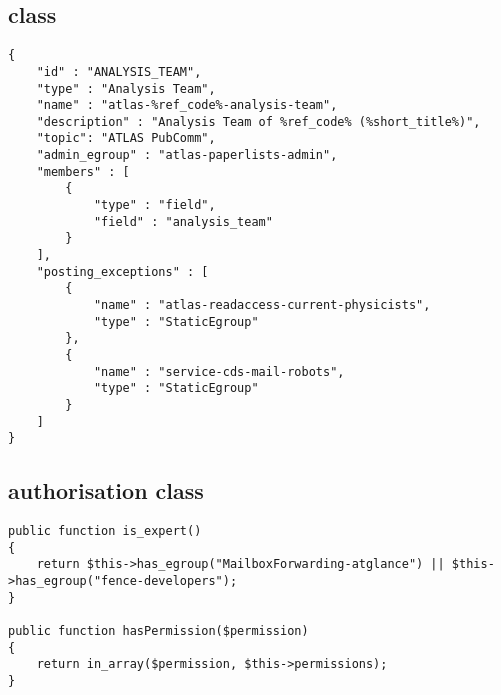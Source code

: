 \subsection{ class}%
\label{app:analysis:egroupmanager}

\begin{lstlisting}
{
    "id" : "ANALYSIS_TEAM",
    "type" : "Analysis Team",
    "name" : "atlas-%ref_code%-analysis-team",
    "description" : "Analysis Team of %ref_code% (%short_title%)",
    "topic": "ATLAS PubComm",
    "admin_egroup" : "atlas-paperlists-admin",
    "members" : [
        {
            "type" : "field",
            "field" : "analysis_team"
        }
    ],
    "posting_exceptions" : [
        {
            "name" : "atlas-readaccess-current-physicists",
            "type" : "StaticEgroup"
        },
        {
            "name" : "service-cds-mail-robots",
            "type" : "StaticEgroup"
        }
    ]
}
\end{lstlisting}


\subsection{ authorisation class}%
\label{app:analysis:userauthorise}

\begin{lstlisting}
public function is_expert()
{
    return $this->has_egroup("MailboxForwarding-atglance") || $this->has_egroup("fence-developers");
}

public function hasPermission($permission)
{
    return in_array($permission, $this->permissions);
}
\end{lstlisting}

